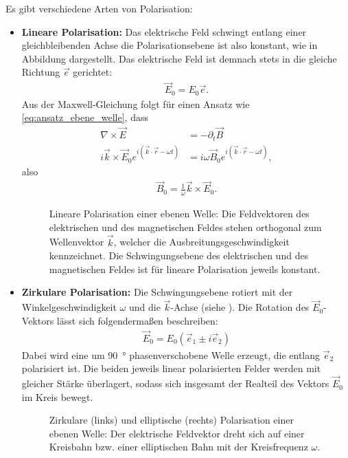 Es gibt verschiedene Arten von Polarisation:
\begin{itemize}
    \item \textbf{Lineare Polarisation:} Das elektrische Feld schwingt entlang einer gleichbleibenden Achse \textendash{} die Polarisationsebene ist also konstant, wie in Abbildung  dargestellt. Das elektrische Feld ist demnach stets in die gleiche Richtung $\vec e$ gerichtet:
          \begin{align*}
              \vec E_0 = E_0 \vec e.
          \end{align*}
          Aus der Maxwell-Gleichung folgt für einen Ansatz wie \eqref{eq:ansatz_ebene_welle}, dass
          \begin{align*}
              \nabla\times\vec E                                         & = -\partial_t\vec B                                   \\
              i\vec k \times \vec E_0 e^{i(\vec k\cdot \vec r-\omega t)} & = i\omega\vec B_0 e^{i(\vec k\cdot \vec r-\omega t)},\end{align*}
          also
          \begin{align}
              \label{eq:b_feld_aus_e_feld}
              \boxed{\vec B_0 = \frac{1}{\omega}\vec k\times \vec E_0.}
          \end{align}
          \begin{figure}[htb]
              \centering
              \tfigLinearePolarisation
              \caption{Lineare Polarisation einer ebenen Welle: Die Feldvektoren des elektrischen und des magnetischen Feldes stehen orthogonal zum Wellenvektor $\vec k$, welcher die Ausbreitungsgeschwindigkeit kennzeichnet. Die Schwingungsebene des elektrischen und des magnetischen Feldes ist für lineare Polarisation jeweils konstant. }
              \label{fig:lineare_polarisation}
          \end{figure}


    \item \textbf{Zirkulare Polarisation:} Die Schwingungsebene rotiert mit der Winkelgeschwindigkeit $\omega$ und die $\vec k$-Achse (siehe ). Die Rotation des $\vec E_0$-Vektors lässt sich folgendermaßen beschreiben:
          \begin{align*}
              \vec E_0 = E_0(\vec e_1\pm i\vec e_2)
          \end{align*}
          Dabei wird eine um \SI{90}{\degree} phasenverschobene Welle erzeugt, die entlang $\vec e_2$ polarisiert ist.
          Die beiden jeweils linear polarisierten Felder werden mit gleicher Stärke überlagert, sodass sich insgesamt der Realteil des Vektors $\vec E_0$ im Kreis bewegt.
          \begin{figure}[htb]
              \centering
              \tfigZirkularePolarisation
              \caption{Zirkulare (links) und elliptische (rechts) Polarisation einer ebenen Welle: Der elektrische Feldvektor dreht sich auf einer Kreisbahn bzw. einer elliptischen Bahn mit der Kreisfrequenz $\omega$. }
              \label{fig:zirkulare_polarisation}
          \end{figure}



\end{itemize}
